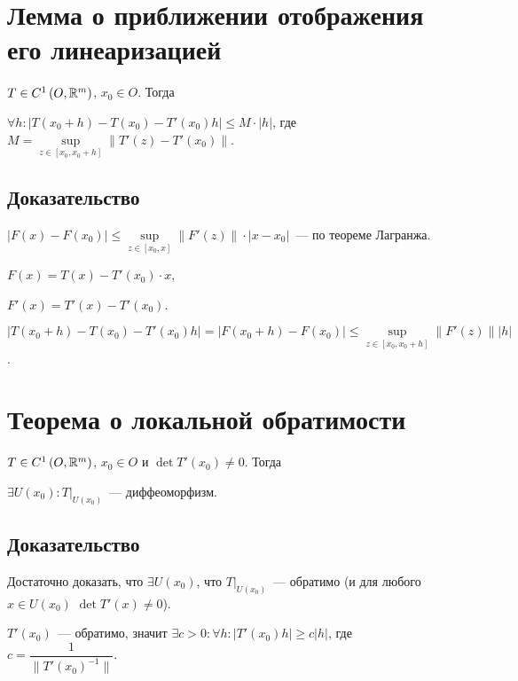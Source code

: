 \documentclass{article}
\begin{document}
    \newpage
    
    \section{Лемма о приближении отображения его линеаризацией}
    
        $T \in C^1 \left( O, \mathbb{R}^m \right)$, $x_0 \in O$. Тогда 
        
        $\forall h : \left| T(x_0 + h) - T(x_0) - T'(x_0) h \right| \leqslant M \cdot |h|$, где $M = \sup\limits_{z \in [x_0, x_0 + h]} \| T'(z) - T'(x_0) \|$.
        
        \subsection{Доказательство}
        
            $\left| F(x) - F(x_0) \right| \leqslant \sup\limits_{z \in [x_0, x]} \| F' (z) \| \cdot | x - x_0 |$~--- по теореме Лагранжа.
            
            $F(x) = T(x) - T'(x_0) \cdot x$,
            
            $F'(x) = T'(x) - T'(x_0)$.
            
            $\left| T(x_0 + h) - T(x_0) - T'(x_0) h \right| = \left| F(x_0 + h) - F(x_0) \right| \leqslant \sup\limits_{z \in [x_0, x_0 + h]} \| F'(z) \| |h|$.
            
    \newpage
    
    \section{Теорема о локальной обратимости}
    
        $T \in C^1 \left( O, \mathbb{R}^m \right)$, $x_0 \in O$ и $\det T'(x_0) \neq 0$. Тогда
        
        $\exists U(x_0) : T \big|_{U(x_0)}$~--- диффеоморфизм.
        
        \subsection{Доказательство}
        
            Достаточно доказать, что $\exists U(x_0)$, что $T \big|_{U(x_0)}$~--- обратимо (и для любого $x \in U(x_0)$ $\det T'(x) \neq 0$).
            
            $T'(x_0)$~--- обратимо, значит $\exists c > 0 : \forall h : \left| T'(x_0) h \right| \geqslant c |h|$, где $c = \dfrac{1}{\| T'(x_0)^{-1} \|}$.
            
\end{document}
